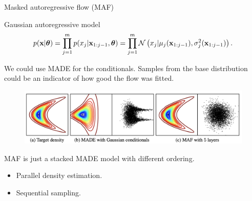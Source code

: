 \documentclass{beamer}
\begin{document}
\begin{frame}{Masked autoregressive flow (MAF)}
	\begin{block}{Gaussian autoregressive model}
		\vspace{-0.7cm}
		\[
		p(\mathbf{x} | \boldsymbol{\theta}) = \prod_{j=1}^m p(x_j | \mathbf{x}_{1:j - 1}, \boldsymbol{\theta}) = \prod_{j=1}^m \mathcal{N} \left(x_j | \mu_j(\mathbf{x}_{1:j-1}), \sigma^2_j (\mathbf{x}_{1:j-1})\right).
		\]
		\vspace{-0.5cm}
	\end{block}
	We could use MADE for the conditionals. 
	Samples from the base distribution could be an indicator of how good the flow was fitted. 
	\vspace{-0.3cm}
	\begin{figure}
		\includegraphics[width=0.95\linewidth]{figs/maf1.png}
	\end{figure}
	MAF is just a stacked MADE model with different ordering.
	\begin{itemize}
		\item Parallel density estimation.
		\item Sequential sampling.
	\end{itemize}
\end{frame}
\end{document}
